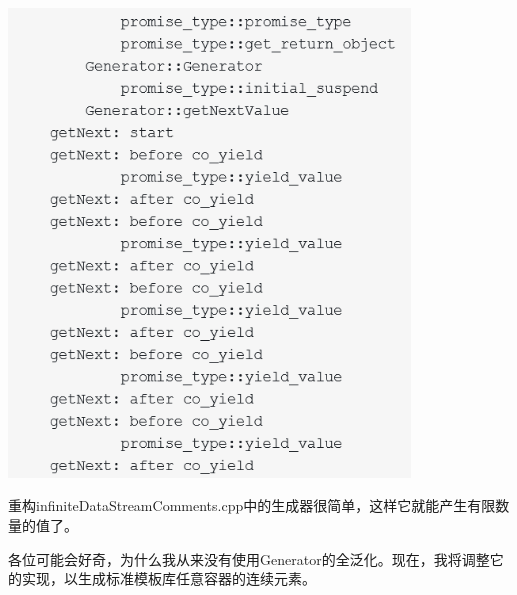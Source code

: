 \begin{center}
\includegraphics[width=0.8\textwidth]{content/3/chapter7/images/17.png}\\
\end{center}

重构infiniteDataStreamComments.cpp中的生成器很简单，这样它就能产生有限数量的值了。


各位可能会好奇，为什么我从来没有使用Generator的全泛化。现在，我将调整它的实现，以生成标准模板库任意容器的连续元素。

